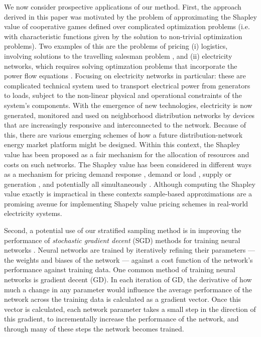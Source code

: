 We now consider prospective applications of our method. 
First, the approach derived in this paper was motivated by the problem of approximating the Shapley value of cooperative games defined over complicated optimization problems (i.e. with characteristic functions given by the solution to non-trivial optimization problems). 
Two examples of this are the problems of pricing (i) logistics, involving solutions to the travelling salesman problem \citep{AzizEtal2016}, and 
(ii) electricity networks, which requires solving optimzation problems that incorporate the power flow equations \citep{DBLP:journals/tsg/OBrienGR15,archie_paper1,ACUNA2018161,burgess_abstract}.
Focusing on electricity networks in particular: 
these are complicated technical system used to transport electrical power from generators to loads, 
subject to the non-linear physical and operational constraints of the system's components.
With the emergence of new technologies, electricity is now generated, monitored and used on neighborhood distribution networks by devices that are increasingly responsive and interconnected to the network. 
Because of this, there are various emerging schemes of how a future distribution-network energy market platform might be designed.
Within this context, the Shapley value has been proposed as a fair mechanism for the allocation of resources and costs on such networks.
The Shapley value has been considered in different ways as a mechanism for pricing demand response \citep{DBLP:journals/tsg/OBrienGR15}, demand or load \citep{archie_paper1}, supply or generation \citep{ACUNA2018161}, and potentially all simultaneously \citep{burgess_abstract}.
Although computing the Shapley value exactly is impractical in these contexts 
sample-based approximations are a promising avenue for implementing Shapely value pricing schemes in real-world electricity systems.

Second, a potential use of our stratified sampling method is in improving the performance of \textit{stochastic gradient decent} (SGD) methods for training neural networks \citep{2016arXiv160904747R}.
Neural networks are trained by iteratively refining their parameters --- the weights and biases of the network --- against a cost function of the network's performance against training data.
One common method of training neural networks is gradient decent (GD).
In each iteration of GD, the derivative of how much a change in any parameter would influence the average performance of the network across the training data is calculated as a gradient vector.
Once this vector is calculated, each network parameter takes a small step in the direction of this gradient, to incrementally increase the performance of the network, 
and through many of these steps the network becomes trained.

